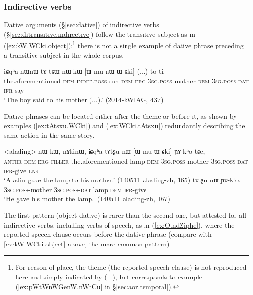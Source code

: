 \subsubsection{Indirective verbs} \label{sec:indirective.word.order}
Dative arguments (§\ref{sec:dative}) of indirective verbs (§\ref{sec:ditransitive.indirective}) follow the transitive subject as in (\ref{ex:kW.WCki.object}):\footnote{For reason of place, the theme (the reported speech clause) is not reproduced here and simply indicated by (...), but corresponds to example (\ref{ex:pWtWnWGenW.nWtCu} in §\ref{sec:aor.temporal}). } there is not a single example of dative phrase preceding a transitive subject in the whole corpus.

\begin{exe}
\ex \label{ex:kW.WCki.object}
\gll  iɕqʰa nɯnɯ tɤ-tɕɯ nɯ kɯ [ɯ-mu nɯ ɯ-ɕki] (...) to-ti. \\
the.aforementioned \textsc{dem} \textsc{indef}.\textsc{poss}-son \textsc{dem} \textsc{erg} \textsc{3sg}.\textsc{poss}-mother \textsc{dem} \textsc{3sg}.\textsc{poss}-\textsc{dat} {  } \textsc{ifr}-say \\
\glt `The boy said to his mother (...).' (2014-kWlAG, 437)
\end{exe}

Dative phrases can be located either after the theme or before it, as shown by examples (\ref{ex:tAtsxu.WCki}) and (\ref{ex:WCki.tAtsxu}) redundantly describing the same action in the same story. 

\begin{exe}
\ex 
\begin{xlist}
\ex \label{ex:tAtsxu.WCki}
\gll  <alading> nɯ kɯ, nɤkinɯ, iɕqʰa tɤtʂu nɯ [ɯ-mu ɯ-ɕki] ɲɤ-kʰo tɕe, \\
\textsc{anthr} \textsc{dem} \textsc{erg} \textsc{filler} the.aforementioned lamp \textsc{dem} \textsc{3sg}.\textsc{poss}-mother  \textsc{3sg}.\textsc{poss}-\textsc{dat} \textsc{ifr}-give \textsc{lnk} \\
\glt `Aladin gave the lamp to his mother.' (140511 alading-zh, 165)
\ex \label{ex:WCki.tAtsxu}
\gll  [ɯ-mu ɯ-ɕki] tɤtʂu nɯ ɲɤ-kʰo. \\
\textsc{3sg}.\textsc{poss}-mother \textsc{3sg}.\textsc{poss}-\textsc{dat} lamp \textsc{dem} \textsc{ifr}-give \\
\glt `He gave his mother the lamp.' (140511 alading-zh, 167)
\end{xlist}
\end{exe}

The first pattern (object-dative) is rarer than the second one, but attested for all indirective verbs, including verbs of speech, as in (\ref{ex:O.ndZiphe}), where the reported speech clause occurs before the dative phrase (compare with \ref{ex:kW.WCki.object} above, the more common pattern).

